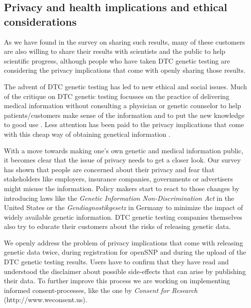 \documentclass[10pt]{article}
\begin{document}
\subsection*{Privacy and health implications and ethical considerations}
As we have found in the survey on sharing such results, many of these customers are also willing to share their results with scientists and 
the public to help scientific progress, although people who have taken DTC genetic testing are considering the privacy implications that come 
with openly sharing those results.      

The advent of DTC genetic testing has led to new ethical and social issues. Much of the critique on DTC genetic testing focusses on the practice 
of delivering medical information without consulting a physician or genetic counselor to help patients/customers make sense of the information 
and to put the new knowledge to good use \cite{Hauskeller2011,Hogarth2008,Wasson2009}. Less attention has been paid to the privacy implications 
that come with this cheap way of obtaining genetical information \cite{Caulfield2011,Joh2011}. 

With a move towards making one's own genetic and medical information public, it becomes clear that the issue of privacy needs to get a closer look. 
Our survey has shown that people are concerned about their privacy and fear that stakeholders like employers, insurance companies, governments 
or advertisers might misuse the information. Policy makers start to react to those changes by introducing laws like the 
\textit{Genetic Information Non-Discrimination Act} in the United States or the \emph{Gendiagnostikgesetz} in Germany to minimize the impact of
widely available genetic information. DTC genetic testing companies themselves also try to educate their customers about the risks of releasing genetic data.  

We openly address the problem of privacy implications that come with releasing genetic data twice, during registration for openSNP and during 
the upload of the DTC genetic testing results. Users have to confirm that they have read and understood the disclaimer about possible side-effects 
that can arise by publishing their data. To further improve this process we are working on implementing informed consent-processes,
like the one by \textit{Consent for Research} (http://www.weconsent.us).
 
\end{document}
